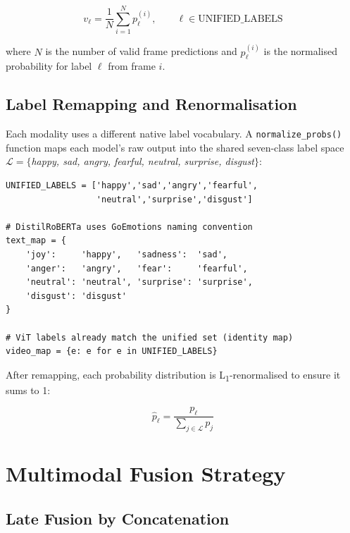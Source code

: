 \documentclass[12pt,a4paper]{article}
\begin{document}
\begin{equation}
v_{\ell} = \frac{1}{N}\sum_{i=1}^{N} p^{(i)}_{\ell},
\qquad \ell \in \text{UNIFIED\_LABELS}
\end{equation}

where $N$ is the number of valid frame predictions and $p^{(i)}_{\ell}$
is the normalised probability for label $\ell$ from frame $i$.

\subsection{Label Remapping and Renormalisation}
\label{sec:labelnorm}

Each modality uses a different native label vocabulary. A
\texttt{normalize\_probs()} function maps each model's raw output
into the shared seven-class label space
$\mathcal{L} = \{$\textit{happy, sad, angry, fearful, neutral, surprise, disgust}$\}$:

\begin{lstlisting}[caption={Label remapping dictionaries.}]
UNIFIED_LABELS = ['happy','sad','angry','fearful',
                  'neutral','surprise','disgust']

# DistilRoBERTa uses GoEmotions naming convention
text_map = {
    'joy':     'happy',   'sadness':  'sad',
    'anger':   'angry',   'fear':     'fearful',
    'neutral': 'neutral', 'surprise': 'surprise',
    'disgust': 'disgust'
}

# ViT labels already match the unified set (identity map)
video_map = {e: e for e in UNIFIED_LABELS}
\end{lstlisting}

After remapping, each probability distribution is L\textsubscript{1}-renormalised
to ensure it sums to 1:

\begin{equation}
\hat{p}_{\ell} = \frac{p_{\ell}}{\displaystyle\sum_{j \in \mathcal{L}} p_{j}}
\end{equation}

\section{Multimodal Fusion Strategy}
\label{sec:fusion}

\subsection{Late Fusion by Concatenation}
\end{document}

